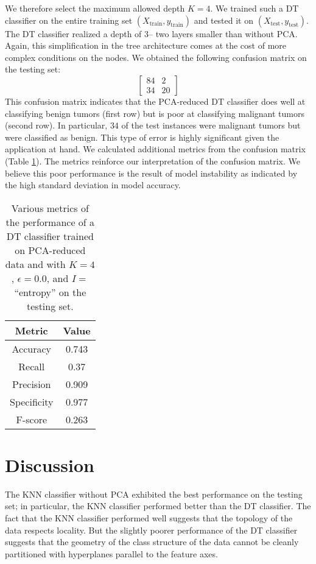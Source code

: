 \documentclass[12pt]{article}
\newcommand{\eps}{\epsilon}
\newcommand{\Xtrain}{X_{\mbox{train}}}
\newcommand{\ytrain}{y_{\mbox{train}}}
\newcommand{\Xtest}{X_{\mbox{test}}}
\newcommand{\ytest}{y_{\mbox{test}}}
\begin{document}
We therefore select the maximum allowed depth $K=4$. We trained such a DT classifier on the entire training set $(\Xtrain, \ytrain)$ and tested it on $(\Xtest, \ytest)$. The DT classifier realized a depth of $3$-- two layers smaller than without PCA. Again, this simplification in the tree architecture comes at the cost of more complex conditions on the nodes. We obtained the following confusion matrix on the testing set:
\[ \begin{bmatrix}
84 & 2 \\
34 & 20
\end{bmatrix} \]
This confusion matrix indicates that the PCA-reduced DT classifier does well at classifying benign tumors (first row) but is poor at classifying malignant tumors (second row). In particular, $34$ of the test instances were malignant tumors but were classified as benign. This type of error is highly significant given the application at hand. We calculated additional metrics from the confusion matrix (Table \ref{part2-pca-table}). The metrics reinforce our interpretation of the confusion matrix. We believe this poor performance is the result of model instability as indicated by the high standard deviation in model accuracy.

\begin{table}
\begin{tabular}{|c|c|} \hline
Metric & Value \\ \hline
Accuracy & 0.743 \\
Recall & 0.37 \\
Precision & 0.909 \\
Specificity & 0.977 \\
F-score & 0.263 \\ \hline
\end{tabular}
\caption{\label{part2-pca-table} Various metrics of the performance of a DT classifier trained on PCA-reduced data and with $K=4$, $\eps=0.0$, and $I=$ ``entropy'' on the testing set.}
\end{table}


\section{Discussion}

The KNN classifier without PCA exhibited the best performance on the testing set; in particular, the KNN classifier performed better than the DT classifier. The fact that the KNN classifier performed well suggests that the topology of the data respects locality. But the slightly poorer performance of the DT classifier suggests that the geometry of the class structure of the data cannot be cleanly partitioned with hyperplanes parallel to the feature axes.
\end{document}
